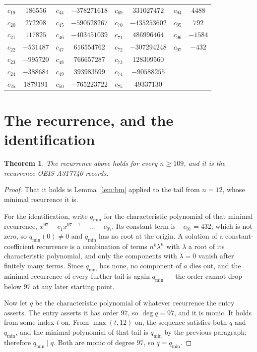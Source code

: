 \documentclass[11pt,a4paper]{article}
\theoremstyle{plain}
\newtheorem{theorem}{Theorem}
\theoremstyle{definition}
\begin{document}
\begin{center}
\begin{tabular}{cccccccc}
$c_{19}$ & $186556$ & $c_{44}$ & $-378271618$ & $c_{69}$ & $331027472$ & $c_{94}$ & $4488$ \\
$c_{20}$ & $272208$ & $c_{45}$ & $-590528267$ & $c_{70}$ & $-435253602$ & $c_{95}$ & $792$ \\
$c_{21}$ & $117825$ & $c_{46}$ & $-403451039$ & $c_{71}$ & $486996464$ & $c_{96}$ & $-1584$ \\
$c_{22}$ & $-531487$ & $c_{47}$ & $616554762$ & $c_{72}$ & $-307294248$ & $c_{97}$ & $-432$ \\
$c_{23}$ & $-995720$ & $c_{48}$ & $766657287$ & $c_{73}$ & $128309560$ &  &  \\
$c_{24}$ & $-388684$ & $c_{49}$ & $393983599$ & $c_{74}$ & $-90588255$ &  &  \\
$c_{25}$ & $1879191$ & $c_{50}$ & $-765223722$ & $c_{75}$ & $49337130$ &  &  \\
\end{tabular}
\end{center}

\section{The recurrence, and the identification}

\begin{theorem}
The recurrence above holds for every $n\ge109$, and it is the recurrence OEIS A317740 records.
\end{theorem}

\begin{proof}
That it holds is Lemma~\ref{lem:bm} applied to the tail from $n=12$, whose minimal
recurrence it is.

For the identification, write $q_{\min}$ for the characteristic polynomial of that minimal
recurrence, $x^{97}-c_1x^{97-1}-\dots-c_{97}$. Its constant term is
$-c_{97}=432$, which is not zero, so $q_{\min}(0)\neq0$ and $q_{\min}$ has no
root at the origin. A solution of a constant-coefficient recurrence is a combination of terms
$n^{k}\lambda^{n}$ with $\lambda$ a root of its characteristic polynomial, and only the
components with $\lambda=0$ vanish after finitely many terms. Since $q_{\min}$ has none, no
component of $a$ dies out, and the minimal recurrence of every further tail is again
$q_{\min}$ --- the order cannot drop below $97$ at any later starting point.

Now let $q$ be the characteristic polynomial of whatever recurrence the entry asserts. The
entry asserts it has order $97$, so $\deg q=97$, and it is monic. It holds from some
index $t$ on. From $\max(t,12)$ on, the sequence satisfies both $q$ and $q_{\min}$, and
the minimal polynomial of that tail is $q_{\min}$ by the previous paragraph; therefore
$q_{\min}\mid q$. Both are monic of degree $97$, so $q=q_{\min}$.
\end{proof}
\end{document}
